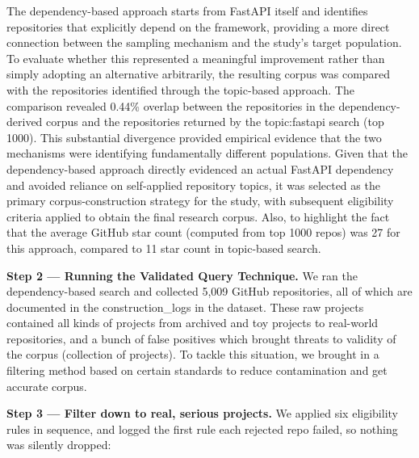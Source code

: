 The dependency-based approach starts from FastAPI itself and identifies repositories that explicitly depend on the framework, providing a more direct connection between the sampling mechanism and the study's target population. To evaluate whether this represented a meaningful improvement rather than simply adopting an alternative arbitrarily, the resulting corpus was compared with the repositories identified through the topic-based approach. The comparison revealed 0.44\% overlap between the repositories in the dependency-derived corpus and the repositories returned by the topic:fastapi search (top 1000). This substantial divergence provided empirical evidence that the two mechanisms were identifying fundamentally different populations. Given that the dependency-based approach directly evidenced an actual FastAPI dependency and avoided reliance on self-applied repository topics, it was selected as the primary corpus-construction strategy for the study, with subsequent eligibility criteria applied to obtain the final research corpus. Also, to highlight the fact that the average GitHub star count (computed from top 1000 repos) was 27 for this approach, compared to 11 star count in topic-based search.

\textbf{Step 2 --- Running the Validated Query Technique.} We ran the dependency-based search and collected 5,009 GitHub repositories, all of which are documented in the construction\_logs in the dataset. These raw projects contained all kinds of projects from archived and toy projects to real-world repositories, and a bunch of false positives which brought threats to validity of the corpus (collection of projects). To tackle this situation, we brought in a filtering method based on certain standards to reduce contamination and get accurate corpus.

\textbf{Step 3 --- Filter down to real, serious projects.} We applied six eligibility rules in sequence, and logged the first rule each rejected repo failed, so nothing was silently dropped:

